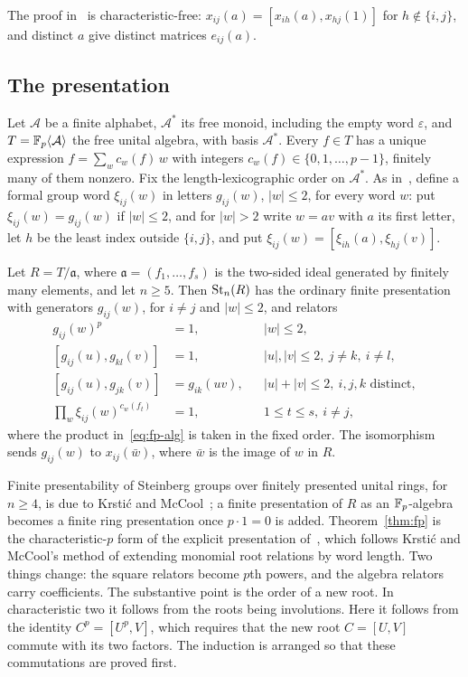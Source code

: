 The proof in~\cite{OAI247periodic} is characteristic-free: $x_{ij}(a)=[x_{ih}(a),x_{hj}(1)]$ for $h\notin\{i,j\}$, and
distinct $a$ give distinct matrices $e_{ij}(a)$.

\subsection{The presentation}

Let $\mathcal A$ be a finite alphabet, $\mathcal A^*$ its free monoid, including the empty word $\varepsilon$, and
$T=\mathbb F_p\langle\mathcal A\rangle$ the free unital algebra, with basis $\mathcal A^*$. Every $f\in T$ has a unique
expression $f=\sum_w c_w(f)\,w$ with integers $c_w(f)\in\{0,1,\dots,p-1\}$, finitely many of them nonzero. Fix the
length-lexicographic order on $\mathcal A^*$. As in~\cite[Theorem~4.1]{OAI247periodic}, define a formal group word
$\xi_{ij}(w)$ in letters $g_{ij}(w)$, $|w|\leq2$, for every word $w$: put $\xi_{ij}(w)=g_{ij}(w)$ if $|w|\leq2$, and
for $|w|>2$ write $w=av$ with $a$ its first letter, let $h$ be the least index outside $\{i,j\}$, and put
$\xi_{ij}(w)=[\xi_{ih}(a),\xi_{hj}(v)]$.

\begin{theorem}\label{thm:fp}
Let $R=T/\mathfrak a$, where $\mathfrak a=(f_1,\dots,f_s)$ is the two-sided ideal generated by finitely many elements,
and let $n\geq5$. Then $\operatorname{St}_n(R)$ has the ordinary finite presentation with generators $g_{ij}(w)$, for $i\neq j$ and
$|w|\leq2$, and relators
\begin{align}
 g_{ij}(w)^p&=1, && |w|\leq2,\label{eq:fp-order}\\
 [g_{ij}(u),g_{kl}(v)]&=1, && |u|,|v|\leq2,\ j\neq k,\ i\neq l,\label{eq:fp-comm}\\
 [g_{ij}(u),g_{jk}(v)]&=g_{ik}(uv), && |u|+|v|\leq2,\ i,j,k\text{ distinct},\label{eq:fp-prod}\\
 \prod_{w}\xi_{ij}(w)^{c_w(f_t)}&=1, && 1\leq t\leq s,\ i\neq j,\label{eq:fp-alg}
\end{align}
where the product in~\eqref{eq:fp-alg} is taken in the fixed order. The isomorphism sends $g_{ij}(w)$ to
$x_{ij}(\bar w)$, where $\bar w$ is the image of $w$ in $R$.
\end{theorem}

Finite presentability of Steinberg groups over finitely presented unital rings, for $n\geq4$, is due to Krsti\'c and
McCool~\cite[Theorem~3]{KrsticMcCool}; a finite presentation of $R$ as an $\mathbb F_p$-algebra becomes a finite ring
presentation once $p\cdot1=0$ is added. Theorem~\ref{thm:fp} is the characteristic-$p$ form of the explicit presentation
of~\cite[Theorem~4.1]{OAI247periodic}, which follows Krsti\'c and McCool's method of extending monomial root relations by
word length. Two things change: the square relators become $p$th powers, and the algebra relators carry
coefficients. The substantive point is the order of a new root. In characteristic two it follows from the roots being
involutions. Here it follows from the identity $C^p=[U^p,V]$, which requires that the new root $C=[U,V]$ commute with
its two factors. The induction is arranged so that these commutations are proved first.

